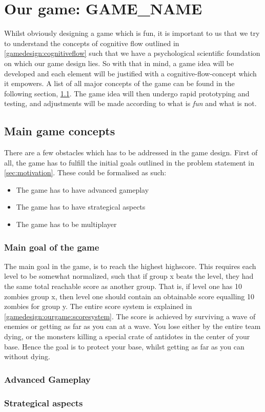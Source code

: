 \section{Our game: GAME\_NAME}

Whilst obviously designing a game which is fun, it is important to us that we try to understand the concepts of cognitive flow outlined in \ref{gamedesign:cognitiveflow} such that we have a psychological scientific foundation on which our game design lies. 
So with that in mind, a game idea will be developed and each element will be justified with a cognitive-flow-concept which it empowers. A list of all major concepts of the game can be found in the following section, \ref{gamedesign:maingameconcepts}. 
The game idea will then undergo rapid prototyping and testing, and adjustments will be made according to what is \emph{fun} and what is not.  

\subsection{Main game concepts}\label{gamedesign:maingameconcepts}
There are a few obstacles which has to be addressed in the game design. First of all, the game has to fulfill the initial goals outlined in the problem statement in \ref{sec:motivation}. These could be formalised as such:

\begin{itemize}
\item The game has to have advanced gameplay
\item The game has to have strategical aspects
\item The game has to be multiplayer
\end{itemize}

\subsubsection{Main goal of the game}
The main goal in the game, is to reach the highest highscore. This requires each level to be somewhat normalized, such that if group x beats the level, they had the same total reachable score as another group. That is, if level one has 10 zombies group x, then level one should contain an obtainable score equalling 10 zombies for group y. The entire score system is explained in \ref{gamedesign:ourgame:scoresystem}. The score is achieved by surviving a wave of enemies or getting as far as you can at a wave. You lose either by the entire team dying, or the monsters killing a special crate of antidotes in the center of your base. Hence the goal is to protect your base, whilst getting as far as you can without dying.

\subsubsection{Advanced Gameplay}


\subsubsection{Strategical aspects}

